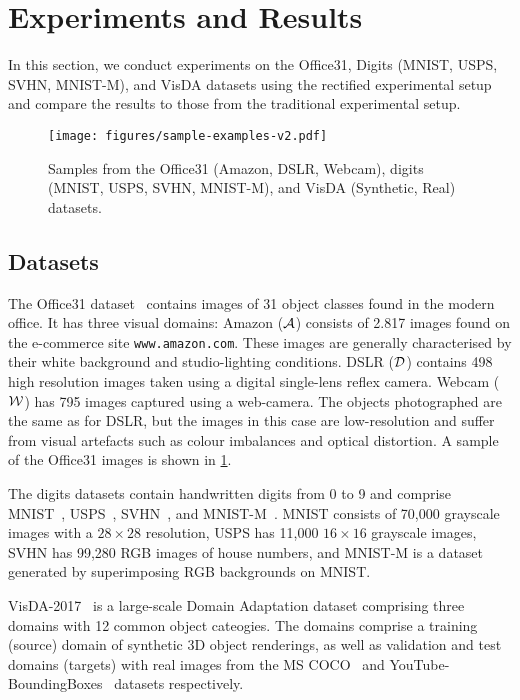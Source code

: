 \documentclass[journal]{IEEEtran}
\begin{document}
\section{Experiments and Results} \label{sec:experiments}
In this section, we conduct experiments on the Office31, Digits (MNIST, USPS, SVHN, MNIST-M), and VisDA datasets using the rectified experimental setup and compare the results to those from the traditional experimental setup.

\begin{figure}[t]
    \centering
    \texttt{[image: figures/sample-examples-v2.pdf]}
    \caption{Samples from the Office31 (Amazon, DSLR, Webcam), digits (MNIST, USPS, SVHN, MNIST-M), and VisDA (Synthetic, Real) datasets.}
    \label{fig:samples}
\end{figure}

\subsection{Datasets}\label{SS:datasets}
The Office31 dataset~\cite{saenko2010adapting} contains images of 31 object classes found in the modern office. It has three visual domains: 
Amazon ($\concept{A}$) consists of 2.817 images found on the e-commerce site \texttt{www.amazon.com}. These images are generally characterised by their white background and studio-lighting conditions.
DSLR ($\concept{D}$) contains 498 high resolution images taken using a digital single-lens reflex camera. 
Webcam ($\concept{W}$) has 795 images captured using a web-camera. The objects photographed are the same as for DSLR, but the images in this case are low-resolution and suffer from visual artefacts such as colour imbalances and optical distortion. A sample of the Office31 images is shown in \cref{fig:samples}.

The digits datasets contain handwritten digits from 0 to 9 and comprise MNIST~\cite{lecun1998gradient}, USPS~\cite{lecun90handwritten}, SVHN~\cite{netzer2011reading}, and MNIST-M~\cite{ganin2016domain}. 
MNIST consists of 70,000 grayscale images with a $28 \times 28$ resolution, USPS has 11,000 $16 \times 16$ grayscale images, SVHN has 99,280 RGB images of house numbers, and MNIST-M is a dataset generated by superimposing RGB backgrounds on MNIST.

VisDA-2017~\cite{peng2018visda} is a large-scale Domain Adaptation dataset comprising three domains with 12 common object cateogies. The domains comprise a training (source) domain of synthetic 3D object renderings, as well as validation and test domains (targets) with real images from the MS COCO~\cite{tsungyi2014coco} and YouTube-BoundingBoxes~\cite{real2017youtube} datasets respectively.
\end{document}
